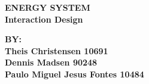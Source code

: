 
\begin{centering}
\thispagestyle{empty} %

\begin{center}
\textbf{\Huge {ENERGY SYSTEM\\Interaction Design}\\ \vspace{1cm}}
\end{center}

\centering
 \end{centering}

\begin{center}
\Large{\textbf{BY: \\Theis Christensen 10691 \\Dennis Madsen 90248\\Paulo Miguel Jesus Fontes 10484}}
\end{center}